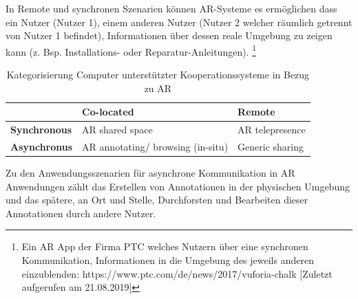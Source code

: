 In Remote und synchronen Szenarien können AR-Systeme es ermöglichen dass ein Nutzer (Nutzer 1), einem anderen Nutzer (Nutzer 2 welcher räumlich getrennt von Nutzer 1 befindet), 
Informationen über dessen reale Umgebung zu zeigen kann (z. Bsp. Installations- oder Reparatur-Anleitungen). \footnote{Ein AR App der Firma PTC welches Nutzern über eine synchronen Kommunikation, Informationen in die Umgebung des jeweils anderen einzublenden: https://www.ptc.com/de/news/2017/vuforia-chalk [Zuletzt aufgerufen am 21.08.2019]} 

\begin{table}[htbp]
\caption{Kategorisierung Computer unterstützter Kooperationssysteme in Bezug zu AR}
	\begin{center}
		\begin{tabular}{|l|ll|}
		\hline
		 & \textbf{Co-located} & \textbf{Remote}\\
		\hline
		\textbf{Synchronous} &  AR shared space & AR telepresence \\
		\textbf{Asynchronus} & AR annotating/ browsing (in-situ) & Generic sharing\\
		\hline
		\end{tabular}
	\end{center}
	\label{tab:categorycscw}
\end{table}

\cite[S.~362]{DieterSchmalstieg2016} Zu den Anwendungsszenarien für asynchrone Kommunikation in AR Anwendungen zählt das Erstellen von Annotationen in der 
physischen Umgebung und das spätere, an Ort und Stelle, Durchforsten und Bearbeiten dieser Annotationen durch andere Nutzer.		

